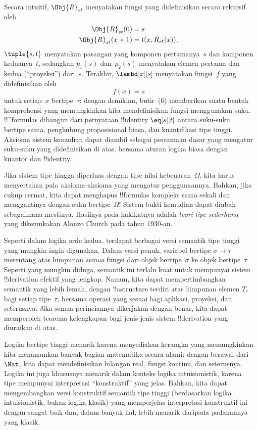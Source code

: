 \documentclass[../../../include/open-logic-section]{subfiles}
\begin{document}
Secara intuitif, $\Obj{R}_{st}$ menyatakan fungsi yang didefinisikan secara
rekursif oleh
\begin{align*}
\Obj{R}_{st}(0) & = s \\
\Obj{R}_{st}(x+1) & = t(x, R_{st}(x)),
\end{align*}
$\tuple{s, t}$ menyatakan pasangan yang komponen pertamanya~$s$ dan komponen
keduanya~$t$, sedangkan $p_1(s)$ dan~$p_2(s)$ menyatakan elemen pertama dan
kedua (``proyeksi'') dari~$s$. Terakhir, $\lambd[x][s]$ menyatakan fungsi~$f$
yang didefinisikan oleh
\[
f(x) = s
\]
untuk setiap~$x$ bertipe~$\tau$; dengan demikian, butir~(6) memberikan suatu
bentuk komprehensi yang memungkinkan kita mendefinisikan fungsi menggunakan
suku. !!^{formula}s dibangun dari pernyataan !!{identity} $\eq[s][t]$ antara
suku-suku bertipe sama, penghubung proposisional biasa, dan kuantifikasi tipe
tinggi. Aksioma sistem kemudian dapat diambil sebagai persamaan dasar yang
mengatur suku-suku yang didefinisikan di atas, bersama aturan logika biasa
dengan kuantor dan !!{identity}.

Jika sistem tipe hingga diperluas dengan tipe nilai kebenaran~$\Omega$, kita
harus menyertakan pula aksioma-aksioma yang mengatur penggunaannya. Bahkan,
jika cukup cermat, kita dapat menghapus !!{formula}s kompleks sama sekali dan
menggantinya dengan suku bertipe~$\Omega$!{} Sistem bukti kemudian dapat
diubah sebagaimana mestinya. Hasilnya pada hakikatnya adalah \emph{teori tipe
sederhana} yang dikemukakan Alonzo Church pada tahun 1930-an.

Seperti dalam logika orde kedua, terdapat berbagai versi semantik tipe tinggi
yang mungkin ingin digunakan. Dalam versi penuh, variabel bertipe $\sigma \to
\tau$ merentang atas himpunan \emph{semua} fungsi dari objek bertipe~$\sigma$
ke objek bertipe~$\tau$. Seperti yang mungkin diduga, semantik ini terlalu
kuat untuk mempunyai sistem !!{derivation} efektif yang lengkap. Namun, kita
dapat mempertimbangkan semantik yang lebih lemah, dengan !!a{structure}
terdiri atas himpunan elemen $T_\tau$ bagi setiap tipe~$\tau$, bersama operasi
yang sesuai bagi aplikasi, proyeksi, dan seterusnya. Jika semua perinciannya
dikerjakan dengan benar, kita dapat memperoleh teorema kelengkapan bagi
jenis-jenis sistem !!{derivation} yang diuraikan di atas.

Logika bertipe tinggi menarik karena menyediakan kerangka yang memungkinkan
kita menanamkan banyak bagian matematika secara alami: dengan berawal dari
$\Nat$, kita dapat mendefinisikan bilangan real, fungsi kontinu, dan
seterusnya. Logika ini juga khususnya menarik dalam konteks logika
intuisionistik, karena tipe mempunyai interpretasi ``konstruktif'' yang jelas.
Bahkan, kita dapat mengembangkan versi konstruktif semantik tipe tinggi
(berdasarkan logika intuisionistik, bukan logika klasik) yang memperjelas
interpretasi konstruktif ini dengan sangat baik dan, dalam banyak hal, lebih
menarik daripada padanannya yang klasik.
\end{document}
